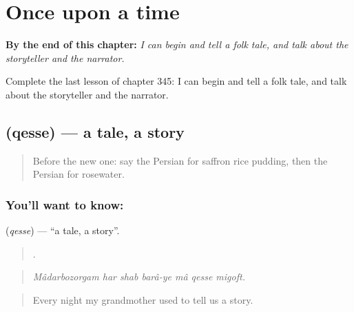 
\chapter{Once upon a time}
\label{ch:fa-once-upon-a-time}

\begin{chapteropening}
\textbf{By the end of this chapter:} \emph{I can begin and tell a folk tale, and talk about the storyteller and the narrator.}

Complete the last lesson of chapter 345: I can begin and tell a folk tale, and talk about the storyteller and the narrator.
\end{chapteropening}

\section[\texorpdfstring{\fa{قصه} (qesse)}{قصه (qesse)}]{ (qesse) — a tale, a story}

\label{lesson:FA-C345-qesse}



\begin{quote}
Before the new one: say the Persian for saffron rice pudding, then the Persian for rosewater.
\end{quote}

\subsection*{You'll want to know: }
\textbf{} (\emph{qesse}) — \textquotedblleft{}a tale, a story\textquotedblright{}.

\begin{quote}
      .
\end{quote}

\begin{quote}
\emph{Mâdarbozorgam har shab barâ-ye mâ qesse migoft.}
\end{quote}

\begin{quote}
Every night my grandmother used to tell us a story.
\end{quote}

